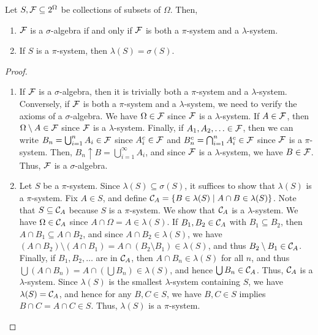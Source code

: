 \begin{theorem}
    Let $S,\mathcal{F} \subseteq 2^{\Omega}$ be collections of subsets of $\Omega$. Then,
    \begin{enumerate}
        \item $\mathcal{F}$ is a $\sigma$-algebra if and only if $\mathcal{F}$ is both a $\pi$-system and a $\lambda$-system.
        \item If $S$ is a $\pi$-system, then $\lambda(S) = \sigma(S)$.
    \end{enumerate}
\end{theorem}
\begin{proof}
    \begin{enumerate}
        \item If $\mathcal{F}$ is a $\sigma$-algebra, then it is trivially both a $\pi$-system and a $\lambda$-system. Conversely, if $\mathcal{F}$ is both a $\pi$-system and a $\lambda$-system, we need to verify the axioms of a $\sigma$-algebra. We have $\Omega \in \mathcal{F}$ since $\mathcal{F}$ is a $\lambda$-system. If $A \in \mathcal{F}$, then $\Omega \setminus A \in \mathcal{F}$ since $\mathcal{F}$ is a $\lambda$-system. Finally, if $A_{1},A_{2},\ldots \in \mathcal{F}$, then we can write $B_{n} = \bigcup_{i=1}^{n} A_{i} \in \mathcal{F}$ since $A_{i}^{c} \in \mathcal{F}$ and $B_{n}^{c} = \bigcap_{i=1}^{n} A_{i}^{c} \in \mathcal{F}$ since $\mathcal{F}$ is a $\pi$-system. Then, $B_{n} \uparrow B = \bigcup_{i=1}^{\infty}A_{i}$, and since $\mathcal{F}$ is a $\lambda$-system, we have $B \in \mathcal{F}$. Thus, $\mathcal{F}$ is a $\sigma$-algebra.
        \item Let $S$ be a $\pi$-system. Since $\lambda(S) \subseteq \sigma(S)$, it suffices to show that $\lambda(S)$ is a $\pi$-system. Fix $A \in S$, and define $\mathcal{C}_{A} = \{B \in \lambda(S) \mid A \cap B \in \lambda(S)\}$. Note that $S \subseteq \mathcal{C}_{A}$ because $S$ is a $\pi$-system. We show that $\mathcal{C}_{A}$ is a $\lambda$-system. We have $\Omega \in \mathcal{C}_{A}$ since $A \cap \Omega = A \in \lambda(S)$. If $B_{1},B_{2} \in \mathcal{C}_{A}$ with $B_{1} \subseteq B_{2}$, then $A \cap B_{1} \subseteq A \cap B_{2}$, and since $A \cap B_{2} \in \lambda(S)$, we have $(A \cap B_{2})\setminus(A \cap B_{1}) = A \cap (B_{2}\setminus B_{1}) \in \lambda(S)$, and thus $B_{2}\setminus B_{1} \in \mathcal{C}_{A}$. Finally, if $B_{1},B_{2},\ldots$ are in $\mathcal{C}_{A}$, then $A \cap B_{n} \in \lambda(S)$ for all $n$, and thus $\bigcup (A\cap B_{n}) = A\cap (\bigcup B_{n}) \in \lambda(S)$, and hence $\bigcup B_{n} \in \mathcal{C}_{A}$. Thus, $\mathcal{C}_{A}$ is a $\lambda$-system. Since $\lambda(S)$ is the smallest $\lambda$-system containing $S$, we have $\lambda(S) = \mathcal{C}_{A}$, and hence for any $B,C \in S$, we have $B,C \in S$ implies $B\cap C = A\cap C \in S$. Thus, $\lambda(S)$ is a $\pi$-system.
    \end{enumerate}
\end{proof}


